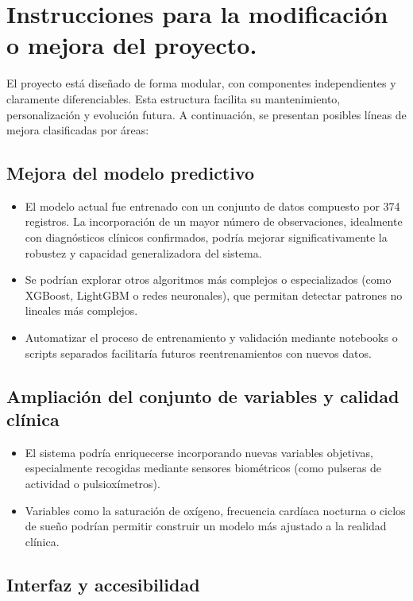 \section{Instrucciones para la modificación o mejora del proyecto.}

El proyecto está diseñado de forma modular, con componentes independientes y claramente diferenciables. Esta estructura facilita su mantenimiento, personalización y evolución futura. A continuación, se presentan posibles líneas de mejora clasificadas por áreas: 

\subsection{Mejora del modelo predictivo}

\begin{itemize}
    \item El modelo actual fue entrenado con un conjunto de datos compuesto por 374 registros. La incorporación de un mayor número de observaciones, idealmente con diagnósticos clínicos confirmados, podría mejorar significativamente la robustez y capacidad generalizadora del sistema.
    \item Se podrían explorar otros algoritmos más complejos o especializados (como XGBoost, LightGBM o redes neuronales), que permitan detectar patrones no lineales más complejos.
    \item Automatizar el proceso de entrenamiento y validación mediante notebooks o scripts separados facilitaría futuros reentrenamientos con nuevos datos. 
\end{itemize}


\subsection{Ampliación del conjunto de variables y calidad clínica}

\begin{itemize}
    \item El sistema podría enriquecerse incorporando nuevas variables objetivas, especialmente recogidas mediante sensores biométricos (como pulseras de actividad o pulsioxímetros).
    \item Variables como la saturación de oxígeno, frecuencia cardíaca nocturna o ciclos de sueño podrían permitir construir un modelo más ajustado a la realidad clínica.
\end{itemize}

\subsection{Interfaz y accesibilidad}

